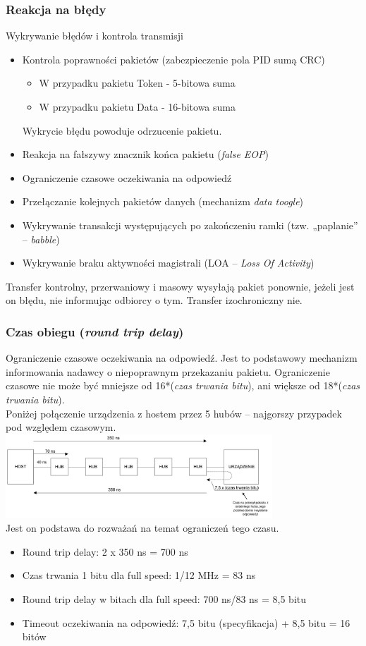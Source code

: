 	\subsubsection{Reakcja na błędy}
	Wykrywanie błędów i kontrola transmisji\\
	\begin{itemize}
		\item Kontrola poprawności pakietów (zabezpieczenie pola PID sumą CRC)
		\begin{itemize}
			\item W przypadku pakietu Token - 5-bitowa suma
			\item W przypadku pakietu Data - 16-bitowa suma
		\end{itemize}
		Wykrycie błędu powoduje odrzucenie pakietu.
		\item Reakcja na fałszywy znacznik końca pakietu (\emph{false EOP})
		\item Ograniczenie czasowe oczekiwania na odpowiedź
		\item Przełączanie kolejnych pakietów danych (mechanizm \emph{data toogle})
		\item Wykrywanie transakcji występujących po zakończeniu ramki (tzw. „paplanie” – \emph{babble})
		\item Wykrywanie braku aktywności magistrali (LOA – \emph{Loss Of Activity})
	\end{itemize}
	Transfer kontrolny, przerwaniowy i masowy wysyłają pakiet ponownie, jeżeli jest on błędu, nie informując odbiorcy o tym. Transfer izochroniczny nie.
	\subsubsection{Czas obiegu (\emph{round trip delay})}
	Ograniczenie czasowe oczekiwania na odpowiedź. Jest to podstawowy mechanizm informowania nadawcy o niepoprawnym przekazaniu pakietu. Ograniczenie czasowe nie może być mniejsze od 16*(\emph{czas trwania bitu}), ani większe od 18*(\emph{czas trwania bitu}).\\
	Poniżej połączenie urządzenia z hostem przez 5 hubów – najgorszy przypadek pod względem czasowym.\\
	\includegraphics[width=10cm]{./wyklady/USB_23_1.pdf}\\
	Jest on podstawa do rozważań na temat ograniczeń tego czasu.
	\begin{itemize}
		\item Round trip delay: 2 x 350 ns = 700 ns
		\item Czas trwania 1 bitu dla full speed: 1/12 MHz = 83 ns
		\item Round trip delay w bitach dla full speed: 700 ns/83 ns = 8,5 bitu
		\item Timeout oczekiwania na odpowiedź: 7,5 bitu (specyfikacja) + 8,5 bitu = 16 bitów
	\end{itemize}
	

